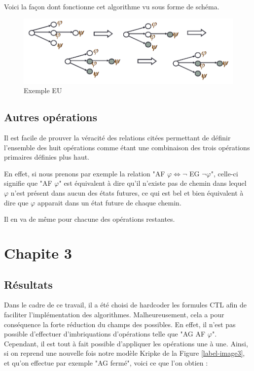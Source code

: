 \documentclass[runningheads,a4paper]{llncs}
\begin{document}
Voici la façon dont fonctionne cet algorithme vu sous forme de schéma.

\begin{figure}[!h]
	\includegraphics[scale=0.5]{EU.png}
	\centering
	\caption{Exemple EU}
	\label{label-image8}
\end{figure}

\subsection{Autres opérations}

Il est facile de prouver la véracité des relations citées permettant de définir l'ensemble des huit opérations comme étant une combinaison des trois opérations primaires définies plus haut.

\noindent En effet, si nous prenons par exemple la relation "AF $\varphi \Leftrightarrow \lnot$ EG $\lnot \varphi$", celle-ci signifie que "AF $\varphi$" est équivalent à dire qu'il n'existe pas de chemin dans lequel $\varphi$ n'est présent dans aucun des états futures, ce qui est bel et bien équivalent à dire que $\varphi$ apparait dans un état future de chaque chemin.

\noindent Il en va de même pour chacune des opérations restantes.

\newpage

\section{Chapite 3}
\subsection{Résultats}
Dans le cadre de ce travail, il a été choisi de hardcoder les formules CTL afin de faciliter l'implémentation des algorithmes. Malheureusement, cela a pour conséquence la forte réduction du champs des possibles. En effet, il n'est pas possible d'effectuer d'imbriquations d'opérations telle que "AG AF $\varphi$". \\
\noindent Cependant, il est tout à fait possible d'appliquer les opérations une à une. Ainsi, si on reprend une nouvelle fois notre modèle Kripke de la Figure \ref{label-image3}, et qu'on effectue par exemple "AG fermé", voici ce que l'on obtien : 
\end{document}
